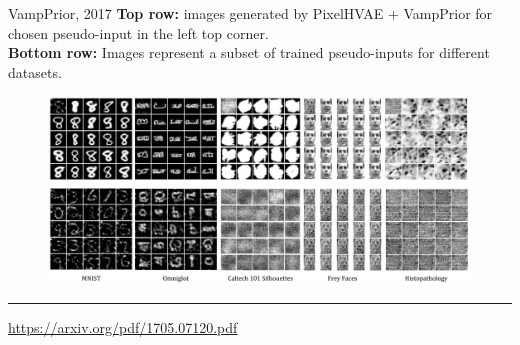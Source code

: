 \documentclass{beamer}
\begin{document}
\begin{frame}{VampPrior, 2017}
\vspace{0.1cm}
\textbf{Top row:} images generated by PixelHVAE + VampPrior for chosen pseudo-input in the left top corner. \\
\vspace{0.1cm}
\textbf{Bottom row:} Images represent a subset of trained pseudo-inputs for different datasets.
\begin{figure}[h]
	\centering
	\includegraphics[width=1.0\linewidth]{figs/VampPrior_4.png}
\end{figure}
\vfill
\hrule\medskip
{\scriptsize \href{https://arxiv.org/pdf/1705.07120.pdf}{https://arxiv.org/pdf/1705.07120.pdf}}
\end{frame}
\end{document}
